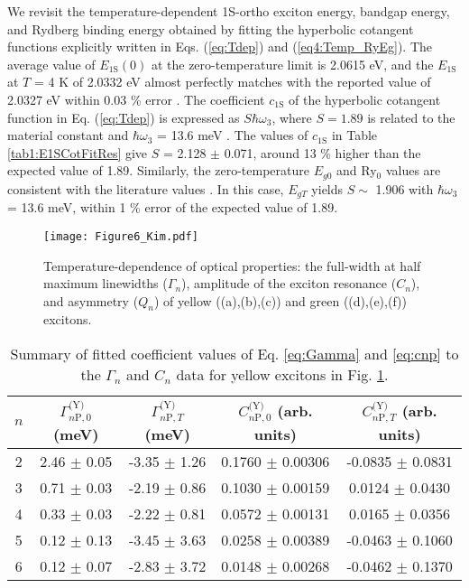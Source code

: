 \documentclass[aps,reprint,amsmath,amssymb,prb]{revtex4-1}
\begin{document}
We revisit the temperature-dependent 1S-ortho exciton energy, bandgap energy, and Rydberg binding energy obtained by fitting the hyperbolic cotangent functions explicitly written in Eqs. (\ref{eq:Tdep}) and (\ref{eq4:Temp_RyEg}). The average value of $E_{\text{1S}} (0)$ at the zero-temperature limit is 2.0615 eV, and the $E_{\text{1S}} $ at $T$ = 4 K of 2.0332 eV almost perfectly matches with the reported value of 2.0327 eV within 0.03 \% error \cite{Biccari2009}. 
The coefficient $c_{\text{1S}}$ of the hyperbolic cotangent function in Eq. (\ref{eq:Tdep}) is expressed as $S \hbar \omega_3$, where $S = 1.89$ is related to the material constant and $\hbar \omega_3$ = 13.6 meV \cite{Biccari2009}. The values of $c_{\text{1S}}$ in Table \ref{tab1:E1SCotFitRes} give $S$ = 2.128 $\pm$ 0.071, around 13 \% higher than the expected value of 1.89. Similarly, the zero-temperature $E_{g0}$ and Ry$_0$ values are consistent with the literature values \cite{Itoh1975}. In this case, $E_{gT}$ yields $S \sim$ 1.906 with $\hbar \omega_3$ = 13.6 meV, within 1 \% error of the expected value of 1.89.

\begin{figure*}[t]
\centering
\texttt{[image: Figure6\_Kim.pdf]}
\caption{Temperature-dependence of optical properties: the full-width at half maximum linewidths ($\Gamma_n$), amplitude of the exciton resonance ($C_n$), and asymmetry ($Q_n$) of yellow ((a),(b),(c))  and green ((d),(e),(f)) excitons.}
\label{Fig6:TemperatureDependence}
\end{figure*}

\begin{table*}[htp]
  \caption{Summary of fitted coefficient values of Eq. \ref{eq:Gamma} and \ref{eq:cnp} to the $\Gamma_n$ and $C_n$ data for yellow excitons in Fig. \ref{Fig6:TemperatureDependence}.}
    \label{tab5:CnGamFittingRes}
    \centering
      \begin{ruledtabular}
    \begin{tabular}{c c c c c } 
            $n$ & $\Gamma_{n\text{P} ,0}^{\text{(Y)}}$ (meV) & $\Gamma_{n\text{P}, T}^{\text{(Y)}}$ (meV) & $C_{n\text{P} ,0}^{\text{(Y)}}$ (arb. units) & $C_{n\text{P}, T}^{\text{(Y)}}$ (arb. units) \\  
        \hline
   
        2 & 2.46  $\pm$ 0.05 & -3.35 $\pm$ 1.26 & 0.1760 $\pm$ 0.00306 & -0.0835 $\pm$ 0.0831 \\  
        3 & 0.71 $\pm$ 0.03 & -2.19 $\pm$ 0.86 & 0.1030 $\pm$ 0.00159 & 0.0124 $\pm$ 0.0430 \\ 
        4 & 0.33 $\pm$ 0.03 & -2.22 $\pm$ 0.81 & 0.0572 $\pm$ 0.00131  & 0.0165 $\pm$ 0.0356  \\ 
        5 & 0.12 $\pm$ 0.13 & -3.45 $\pm$ 3.63 & 0.0258 $\pm$ 0.00389 & -0.0463 $\pm$ 0.1060  \\ 
        6 & 0.12 $\pm$ 0.07 & -2.83 $\pm$ 3.72 & 0.0148 $\pm$ 0.00268 &  -0.0462 $\pm$ 0.1370 \\ 
          \end{tabular}
       \end{ruledtabular}
\end{table*}
\end{document}
